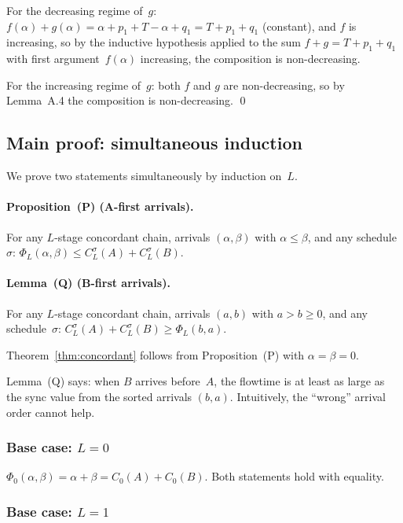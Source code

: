 \documentclass[11pt,titlepage]{article}
\begin{document}
For the decreasing regime of~$g$: $f(\alpha) + g(\alpha)
= \alpha + p_1 + T - \alpha + q_1 = T + p_1 + q_1$
(constant), and $f$ is increasing, so by the inductive
hypothesis applied to the sum $f + g = T + p_1 + q_1$
with first argument~$f(\alpha)$ increasing, the
composition is non-decreasing.

For the increasing regime of~$g$: both $f$ and $g$ are
non-decreasing, so by Lemma~A.4 the
composition is non-decreasing. \qed

\subsection{Main proof: simultaneous induction}

We prove two statements simultaneously by induction on~$L$.

\paragraph{Proposition~(P) (A-first arrivals).}
For any $L$-stage concordant chain, arrivals
$(\alpha, \beta)$ with $\alpha \leq \beta$, and any
schedule~$\sigma$:
$\Phi_L(\alpha, \beta) \leq C_L^\sigma(A) + C_L^\sigma(B)$.

\paragraph{Lemma~(Q) (B-first arrivals).}
For any $L$-stage concordant chain, arrivals $(a, b)$
with $a > b \geq 0$, and any schedule~$\sigma$:
$C_L^\sigma(A) + C_L^\sigma(B) \geq \Phi_L(b, a)$.

\medskip
Theorem~\ref{thm:concordant} follows from
Proposition~(P) with $\alpha = \beta = 0$.

Lemma~(Q) says: when $B$ arrives before~$A$,
the flowtime is at least as large as the sync value from the
sorted arrivals $(b, a)$. Intuitively, the ``wrong'' arrival
order cannot help.

\subsubsection*{Base case: $L = 0$}

$\Phi_0(\alpha,\beta) = \alpha + \beta = C_0(A) + C_0(B)$.
Both statements hold with equality.

\subsubsection*{Base case: $L = 1$}
\end{document}
